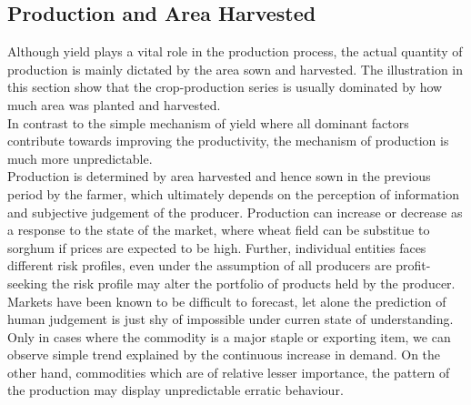 \documentclass[nojss]{jss}
\begin{document}
\subsection{Production and Area Harvested}

Although yield plays a vital role in the production process, the
actual quantity of production is mainly dictated by the area sown and
harvested. The illustration in this section show that the crop-production
series is usually dominated by how much area was planted and
harvested.\\

In contrast to the simple mechanism of yield where all dominant
factors contribute towards improving the productivity, the mechanism
of production is much more unpredictable. \\

Production is determined by area harvested and hence sown in the
previous period by the farmer, which ultimately depends on the
perception of information and subjective judgement of the
producer. Production can increase or decrease  as a response
to the state of the market, where wheat field can be substitue to 
sorghum if prices are expected to be high. Further, individual
entities faces different risk profiles, even under the assumption of
all producers are profit-seeking the risk profile may alter the
portfolio of products held by the producer. Markets have been known to
be difficult to forecast, let alone the prediction of human judgement
is just shy of impossible under curren state of understanding.\\

Only in cases where the commodity is a major staple or exporting item,
we can observe simple trend explained by the continuous increase in
demand. On the other hand, commodities which are of relative lesser
importance, the pattern of the production may display unpredictable
erratic behaviour.\\
\end{document}
